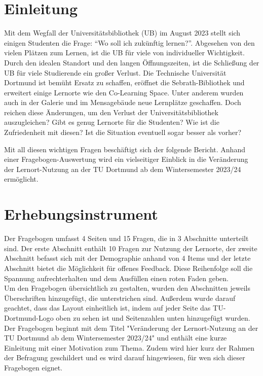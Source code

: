 \documentclass[11pt, a4paper]{article}
\begin{document}
\newpage\null\thispagestyle{empty}\newpage

\newpage
\cleardoublepage%
\section{Einleitung}
\label{Einleitung}
Mit dem Wegfall der Universitätsbibliothek (UB) im August 2023 stellt sich einigen Studenten die Frage: “Wo soll ich zukünftig lernen?”.
Abgesehen von den vielen Plätzen zum Lernen, ist die UB für viele von individueller Wichtigkeit. \cite{.27.01.2024}
Durch den idealen Standort und den langen Öffnungszeiten, ist die Schließung der UB für viele Studierende ein großer Verlust.
Die Technische Universität Dortmund ist bemüht Ersatz zu schaffen, eröffnet die Sebrath-Bibliothek und erweitert einige Lernorte wie den Co-Learning Space.
Unter anderem wurden auch in der Galerie und im Mensagebäude neue Lernplätze geschaffen.
Doch reichen diese Änderungen, um den Verlust der Universitätsbibliothek auszugleichen?
Gibt es genug Lernorte für die Studenten? Wie ist die Zufriedenheit mit diesen?
Ist die Situation eventuell sogar besser als vorher?

Mit all diesen wichtigen Fragen beschäftigt sich der folgende Bericht.
Anhand einer Fragebogen-Auswertung wird ein vielseitiger Einblick in die Veränderung der Lernort-Nutzung an der TU Dortmund ab dem Wintersemester 2023/24 ermöglicht.


\newpage
\section{Erhebungsinstrument}
\label{Erhebungsinstrument}
Der Fragebogen umfasst 4 Seiten und 15 Fragen, die in 3 Abschnitte unterteilt sind. Der erste Abschnitt enthält 10 Fragen zur Nutzung der Lernorte, der zweite Abschnitt befasst sich mit der Demographie anhand von 4 Items und der letzte Abschnitt bietet die Möglichkeit für offenes Feedback. Diese Reihenfolge soll die Spannung aufrechterhalten und dem Ausfüllen einen roten Faden geben.\\

Um den Fragebogen übersichtlich zu gestalten, wurden den Abschnitten jeweils Überschriften hinzugefügt, die unterstrichen sind. Außerdem wurde darauf geachtet, dass das Layout einheitlich ist, indem auf jeder Seite das TU-Dortmund-Logo oben zu sehen ist und Seitenzahlen unten hinzugefügt wurden.
Der Fragebogen beginnt mit dem Titel "Veränderung der Lernort-Nutzung an der TU Dortmund ab dem Wintersemester 2023/24" und enthält eine kurze Einleitung mit einer Motivation zum Thema. Zudem wird hier kurz der Rahmen der Befragung geschildert und es wird darauf hingewiesen, für wen sich dieser Fragebogen eignet.\\
\end{document}
